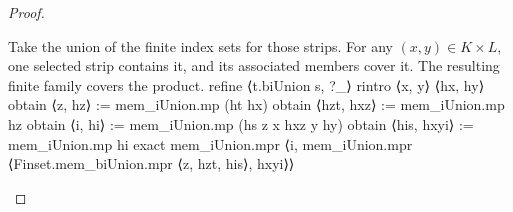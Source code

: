 \begin{proof}
  \begin{lean}{Take the union of the finite index sets for those strips. For any $(x,y)\in K\times L$, one selected strip contains it, and its associated members cover it. The resulting finite family covers the product.}
    refine ⟨t.biUnion s, ?_⟩
    rintro ⟨x, y⟩ ⟨hx, hy⟩
    obtain ⟨z, hz⟩ := mem_iUnion.mp (ht hx)
    obtain ⟨hzt, hxz⟩ := mem_iUnion.mp hz
    obtain ⟨i, hi⟩ := mem_iUnion.mp (hs z x hxz y hy)
    obtain ⟨his, hxyi⟩ := mem_iUnion.mp hi
    exact mem_iUnion.mpr ⟨i, mem_iUnion.mpr ⟨Finset.mem_biUnion.mpr ⟨z, hzt, his⟩, hxyi⟩⟩
  \end{lean}

\end{proof}

